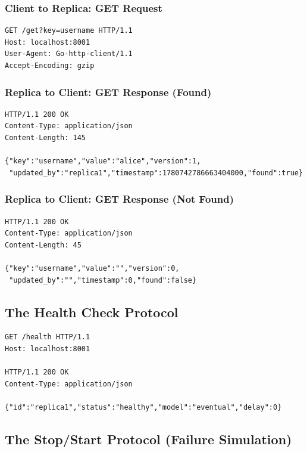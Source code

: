 \documentclass[10pt,a4paper]{article}
\begin{document}
\subsubsection{Client to Replica: GET Request}

\begin{verbatim}
GET /get?key=username HTTP/1.1
Host: localhost:8001
User-Agent: Go-http-client/1.1
Accept-Encoding: gzip
\end{verbatim}

\subsubsection{Replica to Client: GET Response (Found)}

\begin{verbatim}
HTTP/1.1 200 OK
Content-Type: application/json
Content-Length: 145

{"key":"username","value":"alice","version":1,
 "updated_by":"replica1","timestamp":1780742786663404000,"found":true}
\end{verbatim}

\subsubsection{Replica to Client: GET Response (Not Found)}

\begin{verbatim}
HTTP/1.1 200 OK
Content-Type: application/json
Content-Length: 45

{"key":"username","value":"","version":0,
 "updated_by":"","timestamp":0,"found":false}
\end{verbatim}

\subsection{The Health Check Protocol}

\begin{verbatim}
GET /health HTTP/1.1
Host: localhost:8001

HTTP/1.1 200 OK
Content-Type: application/json

{"id":"replica1","status":"healthy","model":"eventual","delay":0}
\end{verbatim}

\subsection{The Stop/Start Protocol (Failure Simulation)}
\end{document}
